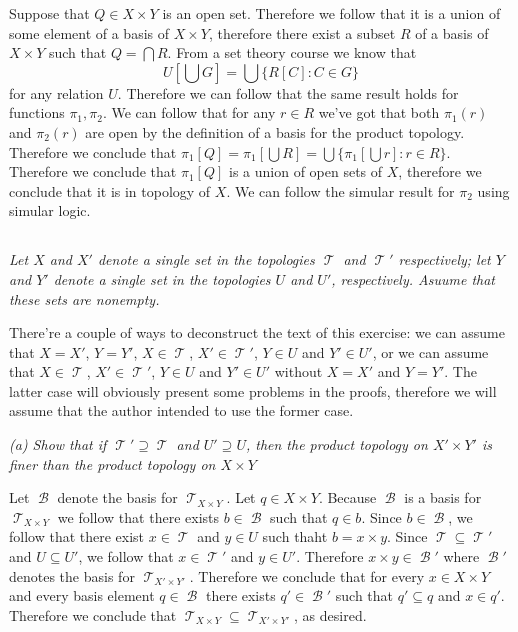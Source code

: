 \documentclass[11pt,oneside,titlepage]{book}
\DeclareMathOperator \topol {\mathcal {T}}
\DeclareMathOperator \basis {\mathcal {B}}
\newcommand{\set}[1]{\{ #1 \}}
\begin{document}
Suppose that $Q \in X \times Y$ is an open set. Therefore we follow that it is a union of
some element of a basis of $X \times Y$, therefore there exist a subset $R$ of a basis of
$X \times Y$ such that $Q = \bigcap{R}$. From a set theory course we know that
$$U[\bigcup{G}] = \bigcup{\set{R[C]: C \in G}}$$
for any relation $U$. Therefore we can follow that the same result holds for functions
$\pi_1, \pi_2$. We can follow that for any $r \in R$ we've got that both $\pi_1(r)$ and
$\pi_2(r)$ are open by the definition of a basis for the product topology. Therefore we
conclude that $\pi_1[Q] = \pi_1[\bigcup{R}] = \bigcup{\set{\pi_1[\bigcup{r}]: r \in R}}$.
Therefore we conclude that $\pi_1[Q]$ is a union of open sets of $X$, therefore we conclude that
it is in topology of $X$. We can follow the simular result for $\pi_2$ using simular logic.

\subsection{}

\textit{Let $X$ and $X'$ denote a single set in the topologies $\topol$ and $\topol'$
  respectively; let $Y$ and $Y'$ denote a single set in the topologies $U$ and $U'$,
  respectively. Asuume that these sets are nonempty. }

There're a couple of ways to deconstruct the text of this exercise: 
we can assume that  $X = X'$,
$Y = Y'$, $X \in \topol$, $X' \in \topol'$, $Y \in U$ and $Y' \in U'$,
or we can assume that $X \in \topol$, $X' \in \topol'$, $Y \in U$ and $Y' \in U'$
without $X = X'$ and $Y = Y'$. The latter case will obviously present some problems
in the proofs, therefore we will assume that the author intended to use the former case.

\textit{(a) Show that if $\topol' \supseteq \topol$ and $U' \supseteq U$, then the product
  topology on $X' \times Y'$ is finer than the product topology on $X \times Y$}

Let $\basis$ denote the basis for $\topol_{X \times Y}$. Let $q \in X \times Y$.
Because $\basis$ is a basis for $\topol_{X \times Y}$ we follow that there exists
$b \in \basis$ such that $q \in b$. Since $b \in \basis$, we follow that there
exist $x \in \topol$ and $y \in U$ such thaht $b = x \times y$.
Since $\topol \subseteq \topol'$ and $U \subseteq U'$,
we follow that $x \in \topol'$ and $y \in U'$. Therefore $x \times y \in \basis'$
where $\basis'$ denotes the basis for $\topol_{X' \times Y'}$. Therefore we conclude that
for every $x \in X \times Y$ and every basis element $q \in \basis$ there exists
$q' \in \basis'$ such that $q' \subseteq q$ and $x \in q'$. Therefore we conclude that
$\topol_{X \times Y} \subseteq \topol_{X' \times Y'}$, as desired.
\end{document}
